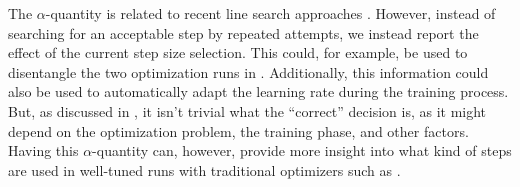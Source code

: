 The $\alpha$-quantity is related to recent line search approaches
\cite{mahsereci2017probabilistic,vaswani2019painless}. However, instead of searching for an
acceptable step by repeated attempts, we instead report the effect of the
current step size selection. This could, for example, be used to disentangle the
two optimization runs in . Additionally, this information could
also be used to automatically adapt the learning rate during the training
process. But, as discussed in , it isn't trivial what the
``correct'' decision is, as it might depend on the optimization problem, the
training phase, and other factors. Having this $\alpha$-quantity can, however,
provide more insight into what kind of steps are used in well-tuned runs with
traditional optimizers such as \sgd.

